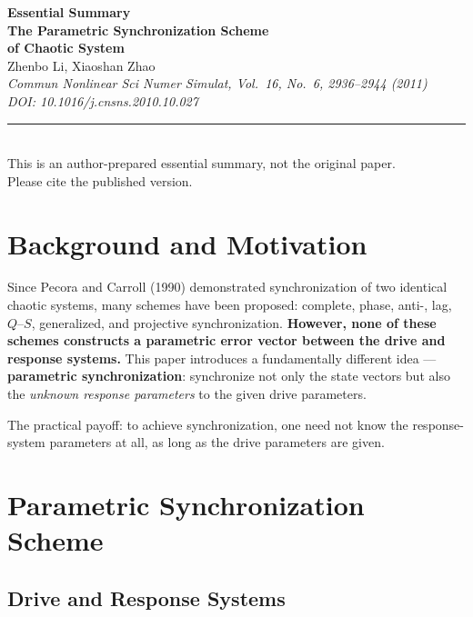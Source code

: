 \documentclass[11pt,a4paper]{article}
\begin{document}
\raggedbottom

\begin{center}
{\LARGE\bfseries\color{primary}Essential Summary}\\[12pt]
{\large\bfseries The Parametric Synchronization Scheme\\of Chaotic System}\\[8pt]
{\normalsize Zhenbo Li, Xiaoshan Zhao}\\[4pt]
{\small\itshape Commun Nonlinear Sci Numer Simulat, Vol.\ 16, No.\ 6, 2936--2944 (2011)\\DOI: 10.1016/j.cnsns.2010.10.027}\\[6pt]
{\small\rule{0.7\textwidth}{0.5pt}}\\[4pt]
{\small\color{accent}This is an author-prepared essential summary, not the original paper.\\Please cite the published version.}
\end{center}

\vspace{0.5em}

\section{Background and Motivation}

Since Pecora and Carroll (1990) demonstrated synchronization of two identical chaotic systems, many schemes have been proposed: complete, phase, anti-, lag, $Q$--$S$, generalized, and projective synchronization. \textbf{However, none of these schemes constructs a parametric error vector between the drive and response systems.} This paper introduces a fundamentally different idea --- \textbf{parametric synchronization}: synchronize not only the state vectors but also the \emph{unknown response parameters} to the given drive parameters.

The practical payoff: to achieve synchronization, one need not know the response-system parameters at all, as long as the drive parameters are given.

\section{Parametric Synchronization Scheme}

\subsection{Drive and Response Systems}
\end{document}
